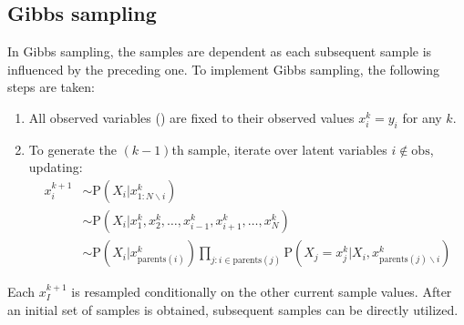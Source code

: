 \subsection{Gibbs sampling}
In Gibbs sampling, the samples are dependent as each subsequent sample is influenced by the preceding one. 
To implement Gibbs sampling, the following steps are taken:
\begin{enumerate}
    \item All observed variables () are fixed to their observed values $x_i^k=y_i$ for any $k$. 
    \item To generate the $(k-1)$th sample, iterate over latent variables $i \notin \text{obs}$, updating: 
        \begin{align*}
            x_i^{k+1}   &\sim \text{P}\left(X_i|x_{1:N\backslash i}^k\right) \\
                        &\sim \text{P}\left(X_i|x_{1}^k,x_{2}^k,\dots,x_{i-1}^k,x_{i+1}^k,\dots,x_{N}^k\right) \\
                        &\sim \text{P}\left(X_i|x_{\text{parents}(i)}^k\right)\prod_{j:i \in \text{parents}(j)}\text{P}\left(X_j=x_j^k|X_i,x_{\text{parents}(j)\backslash i}^k\right)
        \end{align*}
\end{enumerate}
Each $x_I^{k+1}$ is resampled conditionally on the other current sample values.
After an initial set of samples is obtained, subsequent samples can be directly utilized.

